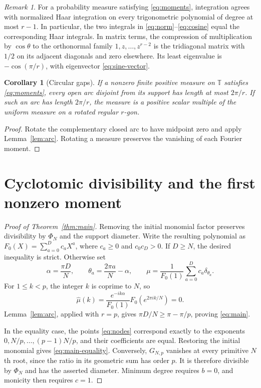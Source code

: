 \documentclass[11pt]{article}
\newtheorem{corollary}[theorem]{Corollary}
\theoremstyle{definition}
\theoremstyle{remark}
\newtheorem{remark}[theorem]{Remark}
\numberwithin{equation}{section}
\newcommand{\T}{\mathbb T}
\begin{document}
\begin{remark}\label{rem:quadrature}
For a probability measure satisfying \eqref{eq:moments}, integration
agrees with normalized Haar integration on every trigonometric
polynomial of degree at most $r-1$. In particular, the two integrals
in \eqref{eq:norm}--\eqref{eq:cosine} equal the corresponding Haar integrals.
In matrix terms, the compression of multiplication by $\cos\theta$
to the orthonormal family $1,z,\ldots,z^{r-2}$ is the tridiagonal matrix
with $1/2$ on its adjacent diagonals and zero elsewhere. Its least
eigenvalue is $-\cos(\pi/r)$, with eigenvector \eqref{eq:sine-vector}.
\end{remark}

\begin{corollary}[Circular gaps]\label{cor:circle-gap}
If a nonzero finite positive measure on $\T$ satisfies
\eqref{eq:moments}, every open arc disjoint from its support has length
at most $2\pi/r$. If such an arc has length $2\pi/r$, the measure is a
positive scalar multiple of the uniform measure on a rotated regular
$r$-gon.
\end{corollary}

\begin{proof}
Rotate the complementary closed arc to have midpoint zero and apply
Lemma~\ref{lem:arc}. Rotating a measure preserves the vanishing of each
Fourier moment.
\end{proof}

\section{Cyclotomic divisibility and the first nonzero moment}
\label{sec:cyclotomic}

\begin{proof}[Proof of Theorem~\ref{thm:main}]
Removing the initial monomial factor preserves divisibility by
$\Phi_N$ and the support diameter. Write the resulting polynomial as
$F_0(X)=\sum_{a=0}^{D}c_aX^a$, where $c_a\ge0$ and $c_0c_D>0$.
If $D\ge N$, the desired inequality is strict. Otherwise set
\begin{equation}\label{eq:polynomial-measure}
 \alpha=\frac{\pi D}{N},\qquad
 \theta_a=\frac{2\pi a}{N}-\alpha,\qquad
 \mu=\frac1{F_0(1)}\sum_{a=0}^Dc_a\delta_{\theta_a}.
\end{equation}
For $1\le k<p$, the integer $k$ is coprime to $N$, so
\[
 \widehat\mu(k)
 =\frac{e^{-ik\alpha}}{F_0(1)}F_0(e^{2\pi ik/N})=0.
\]
Lemma~\ref{lem:arc}, applied with $r=p$, gives
$\pi D/N\ge\pi-\pi/p$, proving \eqref{eq:main}.

In the equality case, the points \eqref{eq:nodes} correspond exactly to
the exponents $0,N/p,\ldots,(p-1)N/p$, and their coefficients are equal.
Restoring the initial monomial gives \eqref{eq:main-equality}.
Conversely, $G_{N,p}$ vanishes at every primitive $N$th root, since the
ratio in its geometric sum has order $p$. It is therefore divisible by
$\Phi_N$ and has the asserted diameter. Minimum degree requires $b=0$,
and monicity then requires $c=1$.
\end{proof}
\end{document}
